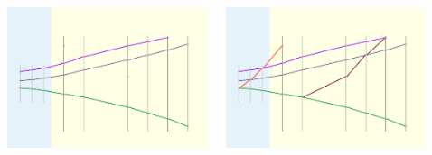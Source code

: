 \documentclass[dvipsnames, aspectratio=43] {beamer}
\begin{document}
\begin{frame}
\begin{columns}[t]
\begin{block}{\bf {}}
    \end{block}
    \begin{block}{\bf {}}
      \includegraphics[width=1.\linewidth]{TrackingScheme_track_selection_by_SharedHits.pdf}
    \end{block}
    \begin{block}{\bf {}}
      \includegraphics[width=1.\linewidth]{TrackingScheme_cells_selection_by_nHits.pdf}
    \end{block}
    \begin{block}{\bf {}}

\end{block}
\end{columns}
\end{frame}
\end{document}
